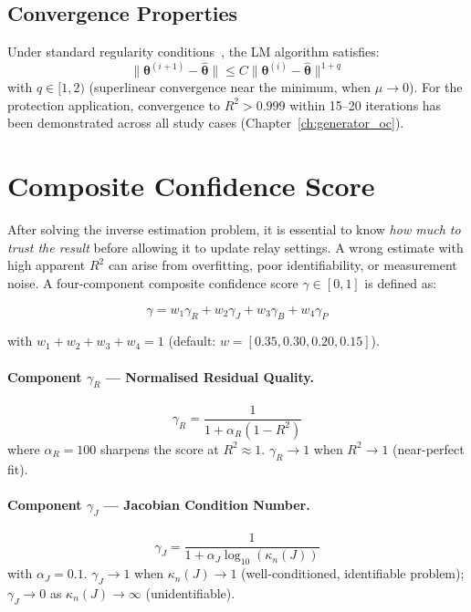 \subsection{Convergence Properties}

Under standard regularity conditions~\citep{Nocedal2006}, the LM algorithm
satisfies:
\begin{equation}
  \|\bm{\theta}^{(i+1)} - \hat{\bm{\theta}}\| \leq C \|\bm{\theta}^{(i)} - \hat{\bm{\theta}}\|^{1+q}
  \label{eq:ch2_lm_convergence}
\end{equation}
with $q \in [1, 2)$ (superlinear convergence near the minimum, when $\mu \to 0$).
For the protection application, convergence to $R^2 > 0.999$ within 15--20
iterations has been demonstrated across all study cases (Chapter~\ref{ch:generator_oc}).

\section{Composite Confidence Score}
\label{sec:ch2_confidence}

After solving the inverse estimation problem, it is essential to know
\emph{how much to trust the result} before allowing it to update relay
settings. A wrong estimate with high apparent $R^2$ can arise from
overfitting, poor identifiability, or measurement noise. A four-component
composite confidence score $\gamma \in [0,1]$ is defined as:

\begin{equation}
  \gamma = w_1 \gamma_R + w_2 \gamma_J + w_3 \gamma_B + w_4 \gamma_P
  \label{eq:ch2_gamma}
\end{equation}

with $w_1 + w_2 + w_3 + w_4 = 1$ (default: $w = [0.35, 0.30, 0.20, 0.15]$).

\paragraph{Component $\gamma_R$ --- Normalised Residual Quality.}
\begin{equation}
  \gamma_R = \frac{1}{1 + \alpha_R (1-R^2)}
  \label{eq:ch2_gamma_r}
\end{equation}
where $\alpha_R = 100$ sharpens the score at $R^2 \approx 1$.
$\gamma_R \to 1$ when $R^2 \to 1$ (near-perfect fit).

\paragraph{Component $\gamma_J$ --- Jacobian Condition Number.}
\begin{equation}
  \gamma_J = \frac{1}{1 + \alpha_J \log_{10}(\kappa_n(J))}
  \label{eq:ch2_gamma_j}
\end{equation}
with $\alpha_J = 0.1$. $\gamma_J \to 1$ when $\kappa_n(J) \to 1$
(well-conditioned, identifiable problem); $\gamma_J \to 0$ as
$\kappa_n(J) \to \infty$ (unidentifiable).

